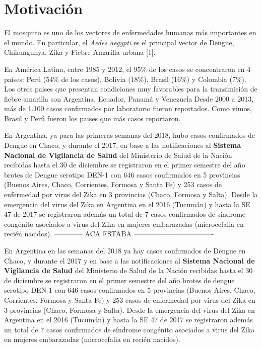 



\chapter{Motivación}

\par El mosquito es uno de los vectores de enfermedades humanas más importantes
en el mundo. En particular, el \textit{Aedes aegypti} es el principal vector
de Dengue, Chikungunya, Zika y Fiebre Amarilla urbana [1].

\par En América Latina, entre 1985 y 2012, el 95\% de los casos se concentraron en
4 países: Perú (54\% de los casos), Bolivia (18\%), Brasil (16\%) y Colombia (7\%).
Los otros paises que presentan condiciones muy favorables para la transimisión
de fiebre amarilla son Argentina, Ecuador, Panamá y Venezuela
Desde 2000 a 2013, más de 1.100 casos confirmados por laboratorio fueron
reportados. Como vimos, Brasil y Perú fueron los paises que más casos reportaron.


\par En Argentina, ya para las primeras semanas del 2018, hubo casos confirmados
de Dengue en Chaco, y durante el 2017, en base a las notificaciones al
\textbf{Sistema Nacional de Vigilancia de Salud} del Ministerio de Salud de la Nación
recibidas hasta el 30 de diciembre se registraron en el primer semestre del año brotes de
Dengue serotipo DEN-1 con 646 casos confirmados en 5 provincias
(Buenos Aires, Chaco, Corrientes, Formosa y Santa Fe) y 253 casos de enfermedad
por virus del Zika en 3 provincias (Chaco, Formosa y Salta).
Desde la emergencia del virus del Zika en Argentina en el 2016 (Tucumán) y hasta
la SE 47 de 2017 se registraron además un total de 7 casos confirmados de
síndrome congénito asociados a virus del Zika en mujeres embarazadas (microcefalia en recién nacidos).
------------ ACA ESTABA ----------------------------------

En Argentina en las semanas del 2018 ya hay casos confirmados de Dengue en Chaco,
y durante el 2017 y en base a las notificaciones al
\textbf{Sistema Nacional de Vigilancia de Salud} del Ministerio de Salud de la Nación
recibidas hasta el 30 de diciembre se registraron en el primer semestre del año brotes de
dengue serotipo DEN-1 con 646 casos confirmados en 5 provincias
(Buenos Aires, Chaco, Corrientes, Formosa y Santa Fe) y 253 casos de enfermedad
por virus del Zika en 3 provincias (Chaco, Formosa y Salta).
Desde la emergencia del virus del Zika en Argentina en el 2016 (Tucumán) y hasta
la SE 47 de 2017 se registraron además un total de 7 casos confirmados de
síndrome congénito asociados a virus del Zika en mujeres embarazadas (microcefalia en recién nacidos).

